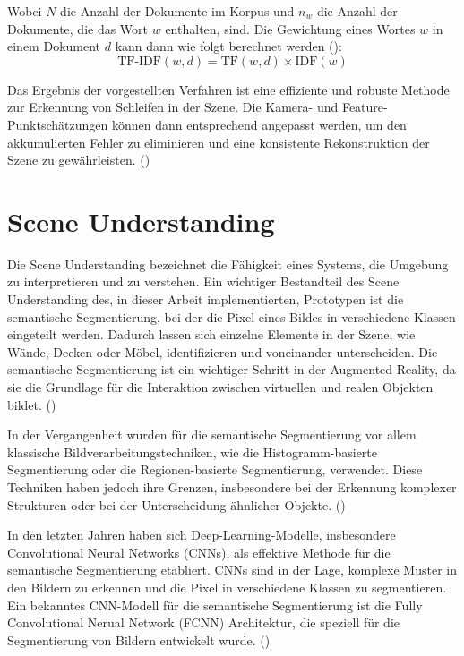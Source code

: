 Wobei \( N \) die Anzahl der Dokumente im Korpus und \( n_w \) die Anzahl der Dokumente, die das Wort \( w \) enthalten, sind. Die Gewichtung eines Wortes \( w \) in einem Dokument \( d \) kann dann wie folgt berechnet werden (\cite{gao2021vSLAM}):
\begin{equation}
    \text{TF-IDF}(w, d) = \text{TF}(w, d) \times \text{IDF}(w)
\end{equation}

Das Ergebnis der vorgestellten Verfahren ist eine effiziente und robuste Methode zur Erkennung von Schleifen in der Szene. Die Kamera- und Feature-Punktschätzungen können dann entsprechend angepasst werden, um den akkumulierten Fehler zu eliminieren und eine konsistente Rekonstruktion der Szene zu gewährleisten. (\cite{gao2021vSLAM})

\section{Scene Understanding} \label{sec:SceneUnderstanding}

Die Scene Understanding bezeichnet die Fähigkeit eines Systems, die Umgebung zu interpretieren und zu verstehen. Ein wichtiger Bestandteil des Scene Understanding des, in dieser Arbeit implementierten, Prototypen ist die semantische Segmentierung, bei der die Pixel eines Bildes in verschiedene Klassen eingeteilt werden. Dadurch lassen sich einzelne Elemente in der Szene, wie Wände, Decken oder Möbel, identifizieren und voneinander unterscheiden. Die semantische Segmentierung ist ein wichtiger Schritt in der Augmented Reality, da sie die Grundlage für die Interaktion zwischen virtuellen und realen Objekten bildet. (\cite{szeliski2022computerVision})

In der Vergangenheit wurden für die semantische Segmentierung vor allem klassische Bildverarbeitungstechniken, wie die Histogramm-basierte Segmentierung oder die Regionen-basierte Segmentierung, verwendet. Diese Techniken haben jedoch ihre Grenzen, insbesondere bei der Erkennung komplexer Strukturen oder bei der Unterscheidung ähnlicher Objekte. (\cite{szeliski2022computerVision})

In den letzten Jahren haben sich Deep-Learning-Modelle, insbesondere Convolutional Neural Networks (CNNs), als effektive Methode für die semantische Segmentierung etabliert. CNNs sind in der Lage, komplexe Muster in den Bildern zu erkennen und die Pixel in verschiedene Klassen zu segmentieren. Ein bekanntes CNN-Modell für die semantische Segmentierung ist die Fully Convolutional Nerual Network (FCNN) Architektur, die speziell für die Segmentierung von Bildern entwickelt wurde. (\cite{long2014fcnn})

